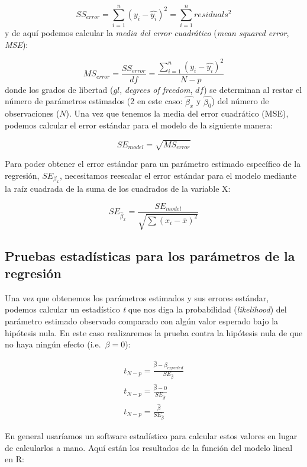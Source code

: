 \documentclass[
  12pt,
]{book}
\begin{document}
\[
SS_{error} = \sum_{i=1}^n{(y_i - \hat{y_i})^2} = \sum_{i=1}^n{residuals^2}
\]
y de aquí podemos calcular la \emph{media del error cuadrático} (\emph{mean squared error}, \emph{MSE}):

\[
MS_{error} = \frac{SS_{error}}{df} = \frac{\sum_{i=1}^n{(y_i - \hat{y_i})^2} }{N - p}
\]
donde los grados de libertad (\(gl\), \emph{degrees of freedom}, \(df\)) se determinan al restar el número de parámetros estimados (2 en este caso: \(\hat{\beta_x}\) y \(\hat{\beta_0}\)) del número de observaciones (\(N\)). Una vez que tenemos la media del error cuadrático (MSE), podemos calcular el error estándar para el modelo de la siguiente manera:

\[
SE_{model} = \sqrt{MS_{error}}
\]

Para poder obtener el error estándar para un parámetro estimado específico de la regresión, \(SE_{\beta_x}\), necesitamos reescalar el error estándar para el modelo mediante la raíz cuadrada de la suma de los cuadrados de la variable X:

\[
SE_{\hat{\beta}_x} = \frac{SE_{model}}{\sqrt{{\sum{(x_i - \bar{x})^2}}}}
\]

\hypertarget{pruebas-estaduxedsticas-para-los-paruxe1metros-de-la-regresiuxf3n}{%
\subsection{Pruebas estadísticas para los parámetros de la regresión}\label{pruebas-estaduxedsticas-para-los-paruxe1metros-de-la-regresiuxf3n}}

Una vez que obtenemos los parámetros estimados y sus errores estándar, podemos calcular un estadístico \emph{t} que nos diga la probabilidad (\emph{likelihood}) del parámetro estimado observado comparado con algún valor esperado bajo la hipótesis nula. En este caso realizaremos la prueba contra la hipótesis nula de que no haya ningún efecto (i.e.~\(\beta=0\)):

\[
\begin{array}{c}
t_{N - p} = \frac{\hat{\beta} - \beta_{expected}}{SE_{\hat{\beta}}}\\
t_{N - p} = \frac{\hat{\beta} - 0}{SE_{\hat{\beta}}}\\
t_{N - p} = \frac{\hat{\beta} }{SE_{\hat{\beta}}}
\end{array}
\]

En general usaríamos un software estadístico para calcular estos valores en lugar de calcularlos a mano. Aquí están los resultados de la función del modelo lineal en R:
\end{document}
